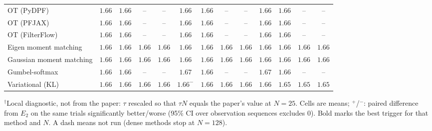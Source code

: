 \begin{table}[ht]
\begin{adjustbox}{max width=\linewidth}
\begin{tabular}{lcccc|cccc|cccc}
OT (PyDPF) & $\mathbf{1.66}$ & $1.66$ & -- & -- & $1.66$ & $1.66$ & -- & -- & $1.66$ & $\mathbf{1.66}$ & -- & -- \\
OT (PFJAX) & $\mathbf{1.66}$ & $1.66$ & -- & -- & $1.66$ & $1.66$ & -- & -- & $1.66$ & $\mathbf{1.66}$ & -- & -- \\
OT (FilterFlow) & $1.66$ & $1.66$ & -- & -- & $\mathbf{1.66}$ & $1.66$ & -- & -- & $1.66$ & $\mathbf{1.66}$ & -- & -- \\
Eigen moment matching & $1.66$ & $1.66$ & $1.66$ & $\mathbf{1.66}$ & $1.66$ & $1.66$ & $1.66$ & $1.66$ & $\mathbf{1.66}$ & $\mathbf{1.66}$ & $\mathbf{1.66}$ & $\mathbf{1.66}$ \\
Gaussian moment matching & $\mathbf{1.66}$ & $1.66$ & $1.66$ & $1.66$ & $1.66$ & $1.66$ & $1.66$ & $1.66$ & $1.66$ & $\mathbf{1.66}$ & $\mathbf{1.66}$ & $\mathbf{1.66}$ \\
Gumbel-softmax & $\mathbf{1.66}$ & $1.66$ & -- & -- & $1.67$ & $1.66$ & -- & -- & $1.67$ & $\mathbf{1.66}$ & -- & -- \\
Variational (KL) & $1.66$ & $1.66$ & $1.66$ & $1.66$ & $1.66^{-}$ & $1.66$ & $1.66$ & $1.66$ & $\mathbf{1.66}$ & $\mathbf{1.65}$ & $\mathbf{1.65}$ & $\mathbf{1.65}$ \\
\bottomrule
\end{tabular}
\end{adjustbox}
\par\smallskip\parbox{0.95\linewidth}{\footnotesize $^\dagger$Local diagnostic, not from the paper: $\tau$ rescaled so that $\tau N$ equals the paper's value at $N{=}25$. Cells are means; $^{+}$/$^{-}$: paired difference from $E_2$ on the same trials significantly better/worse (95\% CI over observation sequences excludes 0). Bold marks the best trigger for that method and $N$. A dash means not run (dense methods stop at $N{=}128$).}
\end{table}

